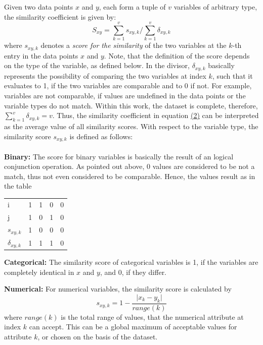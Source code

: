 	Given two data points $x$ and $y$, each form a tuple of $v$ variables of arbitrary type, the similarity coefficient is given by:
	\begin{equation}\label{eq1}
	S_{xy} = \sum_{k=1}^{v} s_{xy,k} / \sum_{k=1}^{v} \delta_{xy,k} 
	\end{equation} 
	where $s_{xy,k}$ denotes a \textit{score for the similarity} of the two variables at the $k$-th entry in the data points $x$ and $y$. Note, that the definition of the score depends on the
	type of the variable, as defined below. In the divisor, $\delta_{xy,k}$ basically represents the possibility of comparing the two variables at index $k$, such that it evaluates to 1, if the two variables are comparable and to 0 if not. %
	For example, variables are not comparable, if values are undefined in the data points or the variable types do not match. Within this work, the dataset is complete, therefore, $\sum_{k=1}^{v} \delta_{xy,k}=v$. Thus, the similarity coefficient in equation \hyperref[eq1]{(2)} can be interpreted as the average value of all similarity scores. 
	With respect to the variable type, the similarity score $s_{xy,k}$ is defined as follows:\\
	\\ \textbf{Binary:} The score for binary variables is basically the result of an logical conjunction operation. As pointed out above, 0 values are considered to be not a match, thus not even considered to be comparable. Hence, the values result as in the table
		\begin{center}
			\begin{tabular}{l | c c c r}
				i & 1 & 1 & 0 & 0 \\
				j & 1 & 0 & 1 & 0 \\
				\hline
				$s_{xy,k}$ & 1 & 0 & 0 & 0 \\
				$\delta_{xy,k}$ & 1 & 1 & 1 & 0
			\end{tabular}
		\end{center}	
	\textbf{Categorical:} The similarity score of categorical variables is 1, if the variables are completely identical in $x$ and $y$, and 0, if they differ.
	
	\textbf{Numerical:} For numerical variables, the similarity score is calculated by
		\begin{equation*}
		s_{xy,k} = 1 - \frac{\vert x_k - y_k \vert}{range(k)}
		\end{equation*}
		where $range(k)$ is the total range of values, that the numerical attribute at index $k$ can accept. This can be a global maximum of acceptable values for attribute $k$, or chosen on the basis of the dataset.

